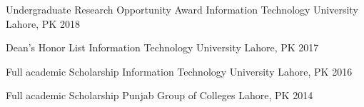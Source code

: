 



\begin{cvhonors}

  \cvhonor
    {Undergraduate Research Opportunity Award} %
    {Information Technology University} %
    {Lahore, PK} %
    {2018} %

  \cvhonor
    {Dean's Honor List} %
    {Information Technology University} %
    {Lahore, PK} %
    {2017} %

  \cvhonor
    {Full academic Scholarship} %
    {Information Technology University} %
    {Lahore, PK} %
    {2016} %

  \cvhonor
    {Full academic Scholarship} %
    {Punjab Group of Colleges} %
    {Lahore, PK} %
    {2014} %

\end{cvhonors}







